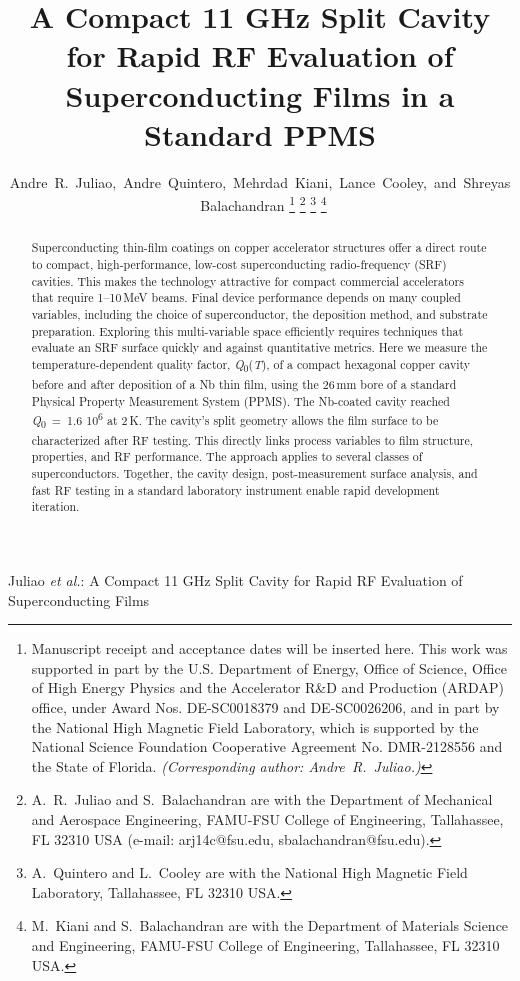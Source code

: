 \documentclass[letterpaper,journal]{IEEEtran}
\begin{document}
\title{A Compact 11 GHz Split Cavity for Rapid RF Evaluation of Superconducting Films in a Standard PPMS}

\author{Andre~R.~Juliao,~Andre~Quintero,~Mehrdad~Kiani,~Lance~Cooley,~and~Shreyas~Balachandran%
\thanks{Manuscript receipt and acceptance dates will be inserted here. This work was supported in part by the U.S. Department of Energy, Office of Science, Office of High Energy Physics and the Accelerator R\&D and Production (ARDAP) office, under Award Nos. DE-SC0018379 and DE-SC0026206, and in part by the National High Magnetic Field Laboratory, which is supported by the National Science Foundation Cooperative Agreement No. DMR-2128556 and the State of Florida. \emph{(Corresponding author: Andre~R.~Juliao.)}}%
\thanks{A.~R.~Juliao and S.~Balachandran are with the Department of Mechanical and Aerospace Engineering, FAMU-FSU College of Engineering, Tallahassee, FL 32310 USA (e-mail: arj14c@fsu.edu, sbalachandran@fsu.edu).}%
\thanks{A.~Quintero and L.~Cooley are with the National High Magnetic Field Laboratory, Tallahassee, FL 32310 USA.}%
\thanks{M.~Kiani and S.~Balachandran are with the Department of Materials Science and Engineering, FAMU-FSU College of Engineering, Tallahassee, FL 32310 USA.}%
}

%
{Juliao \MakeLowercase{\textit{et al.}}: A Compact 11 GHz Split Cavity for Rapid RF Evaluation of Superconducting Films}

\maketitle

\begin{abstract}
Superconducting thin-film coatings on copper accelerator structures offer a direct route to compact, high-performance, low-cost superconducting radio-frequency (SRF) cavities. This makes the technology attractive for compact commercial accelerators that require 1--10\,MeV beams. Final device performance depends on many coupled variables, including the choice of superconductor, the deposition method, and substrate preparation. Exploring this multi-variable space efficiently requires techniques that evaluate an SRF surface quickly and against quantitative metrics. Here we measure the temperature-dependent quality factor, \textit{Q}\textsubscript{0}(\textit{T}), of a compact hexagonal copper cavity before and after deposition of a Nb thin film, using the 26\,mm bore of a standard Physical Property Measurement System (PPMS). The Nb-coated cavity reached \textit{Q}\textsubscript{0}~=~1.6\,\texttimes\,10\textsuperscript{6} at 2\,K. The cavity's split geometry allows the film surface to be characterized after RF testing. This directly links process variables to film structure, properties, and RF performance. The approach applies to several classes of superconductors. Together, the cavity design, post-measurement surface analysis, and fast RF testing in a standard laboratory instrument enable rapid development iteration.

\end{abstract}
\end{document}
